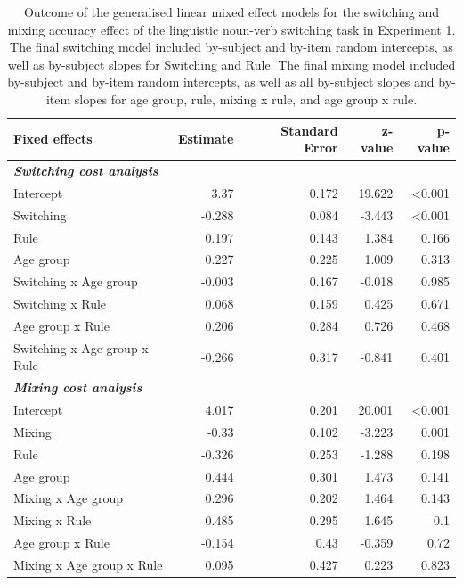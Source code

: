 \documentclass[
]{article}
\begin{document}
\begin{table}

\caption{\label{tab:TableS2}Outcome of the generalised linear mixed effect models for the switching and mixing accuracy effect of the linguistic noun-verb switching task in Experiment 1. The final switching model included by-subject and by-item random intercepts, as well as by-subject slopes for Switching and Rule. The final mixing model included by-subject and by-item random intercepts, as well as all by-subject slopes and by-item slopes for age group, rule, mixing x rule, and age group x rule.}
\centering
\begin{tabular}[t]{lrrrr}
\toprule
\textbf{Fixed effects} & \textbf{Estimate} & \textbf{Standard Error} & \textbf{z-value} & \textbf{p-value}\\
\midrule
\em{\textbf{Switching cost analysis}} & \em{\textbf{}} & \em{\textbf{}} & \em{\textbf{}} & \em{\textbf{}}\\
Intercept & 3.37 & 0.172 & 19.622 & <0.001\\
Switching & -0.288 & 0.084 & -3.443 & <0.001\\
Rule & 0.197 & 0.143 & 1.384 & 0.166\\
Age group & 0.227 & 0.225 & 1.009 & 0.313\\
\addlinespace
Switching x Age group & -0.003 & 0.167 & -0.018 & 0.985\\
Switching x Rule & 0.068 & 0.159 & 0.425 & 0.671\\
Age group x Rule & 0.206 & 0.284 & 0.726 & 0.468\\
Switching x Age group x Rule & -0.266 & 0.317 & -0.841 & 0.401\\
\em{\textbf{Mixing cost analysis}} & \em{\textbf{}} & \em{\textbf{}} & \em{\textbf{}} & \em{\textbf{}}\\
\addlinespace
Intercept & 4.017 & 0.201 & 20.001 & <0.001\\
Mixing & -0.33 & 0.102 & -3.223 & 0.001\\
Rule & -0.326 & 0.253 & -1.288 & 0.198\\
Age group & 0.444 & 0.301 & 1.473 & 0.141\\
Mixing x Age group & 0.296 & 0.202 & 1.464 & 0.143\\
\addlinespace
Mixing x Rule & 0.485 & 0.295 & 1.645 & 0.1\\
Age group x Rule & -0.154 & 0.43 & -0.359 & 0.72\\
Mixing x Age group x Rule & 0.095 & 0.427 & 0.223 & 0.823\\
\bottomrule
\end{tabular}
\end{table}
\end{document}
